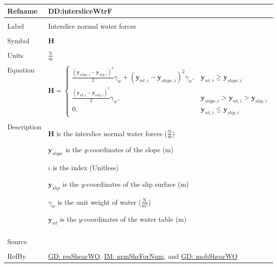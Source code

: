 \documentclass[12pt]{article}
\begin{document}
\begin{minipage}{\textwidth}
\begin{tabular}{>{\raggedright}p{}>{\raggedright\arraybackslash}p{}}
\toprule \textbf{Refname} & \textbf{DD:intersliceWtrF}
\label{DD:intersliceWtrF}
\\ \midrule \\
Label & Interslice normal water forces
        
\\ \midrule \\
Symbol & $\mathbf{H}$
         
\\ \midrule \\
Units & $\frac{\text{N}}{\text{m}}$
        
\\ \midrule \\
Equation & \begin{displaymath}
           \mathbf{H}=\begin{cases}
                      \frac{\left({\mathbf{y}_{slope,i}}-{\mathbf{y}_{slip,i}}\right)^{2}}{2} {γ_{w}}+\left({\mathbf{y}_{wt,i}}-{\mathbf{y}_{slope,i}}\right)^{2} {γ_{w}}, & {\mathbf{y}_{wt,i}}\geq{}{\mathbf{y}_{slope,i}}\\
\frac{\left({\mathbf{y}_{wt,i}}-{\mathbf{y}_{slip,i}}\right)^{2}}{2} {γ_{w}}, & {\mathbf{y}_{slope,i}}>{\mathbf{y}_{wt,i}}>{\mathbf{y}_{slip,i}}\\
0, & {\mathbf{y}_{wt,i}}\leq{}{\mathbf{y}_{slip,i}}
                      \end{cases}
           \end{displaymath}
\\ \midrule \\
Description & \begin{symbDescription}
              \item{$\mathbf{H}$ is the interslice normal water forces ($\frac{\text{N}}{\text{m}}$)}
              \item{${\mathbf{y}_{slope}}$ is the $y$-coordinates of the slope (m)}
              \item{$i$ is the index (Unitless)}
              \item{${\mathbf{y}_{slip}}$ is the $y$-coordinates of the slip surface (m)}
              \item{${γ_{w}}$ is the unit weight of water ($\frac{\text{N}}{\text{m}^{3}}$)}
              \item{${\mathbf{y}_{wt}}$ is the $y$-coordinates of the water table (m)}
              \end{symbDescription}
\\ \midrule \\
Source & \cite{fredlund1977}
         
\\ \midrule \\
RefBy & \hyperref[GD:resShearWO]{GD: resShearWO}, \hyperref[IM:nrmShrForNum]{IM: nrmShrForNum}, and \hyperref[GD:mobShearWO]{GD: mobShearWO}
        
\\ \bottomrule
\end{tabular}
\end{minipage}
\end{document}
